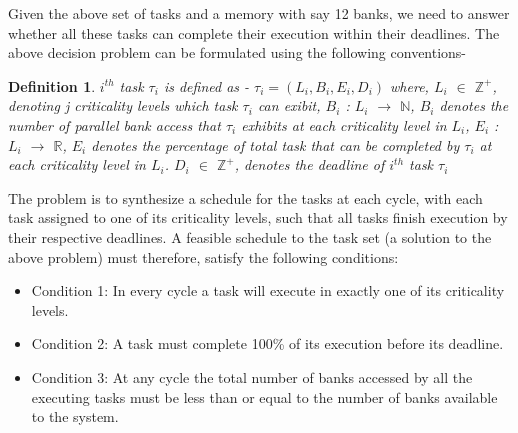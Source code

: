 \noindent 
Given the above set of tasks and a memory with say 12 banks, we need to answer whether all these tasks can complete 
their execution within their deadlines. The above decision problem can be formulated using the following conventions- 

\noindent
\newtheorem{defn}{Definition}[section]

\begin{defn}
$i^{th}$ task $\tau_{i}$ is defined as -
\newline
\newline
$\tau_{i} = (L_{i}, B_{i}, E_{i}, D_{i})$
\newline
\newline
where, $L_{i}$ $\in$ $\mathbb{Z^{+}}$, denoting j criticality levels which task $\tau_{i}$ can exibit,
\newline
\newline
$B_{i}$ : $L_{i}$ $\rightarrow$ $\mathbb{N}$, $B_{i}$ denotes the number of parallel bank access that 
$\tau_{i}$ exhibits at each criticality level in $L_{i}$,
\newline
\newline
$E_{i}$ : $L_{i}$ $\rightarrow$ $\mathbb{R}$, $E_{i}$ denotes the percentage of total task that can be completed by $\tau_{i}$ at each criticality level in  $L_{i}$.
\newline
\newline
$D_{i}$ $\in$ $\mathbb{Z^{+}}$, denotes the deadline of $i^{th}$ task $\tau_{i}$
\newline
\end{defn}

\noindent
The problem is to synthesize a schedule for the tasks at each cycle, with each task assigned to one of its criticality levels, 
such that all tasks finish execution by their respective deadlines. A feasible schedule to the task set (a solution to the 
above problem) must therefore, satisfy the following conditions:
\begin{itemize}
 \item Condition 1: In every cycle a task will execute in exactly one of its criticality levels.
\item Condition 2: A task must complete 100\% of its execution before its deadline.
\item Condition 3: At any cycle the total number of banks accessed by all the executing tasks must be less than or equal to the 
number of banks available to the system.
\end{itemize}

